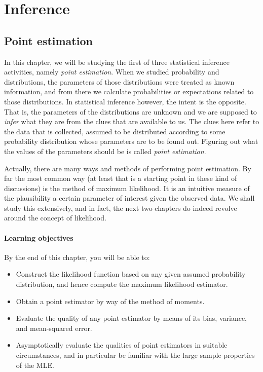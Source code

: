 \documentclass[
]{book}
\providecommand{\tightlist}{%
  \setlength{\itemsep}{0pt}\setlength{\parskip}{0pt}}
\theoremstyle{definition}
\theoremstyle{definition}
\theoremstyle{definition}
\theoremstyle{definition}
\theoremstyle{remark}
\begin{document}
\hypertarget{part-inference}{%
\part{Inference}\label{part-inference}}

\hypertarget{point-estimation}{%
\chapter{Point estimation}\label{point-estimation}}

In this chapter, we will be studying the first of three statistical inference activities, namely \emph{point estimation}.
When we studied probability and distributions, the parameters of those distributions were treated as known information, and from there we calculate probabilities or expectations related to those distributions.
In statistical inference however, the intent is the opposite.
That is, the parameters of the distributions are unknown and we are supposed to \emph{infer} what they are from the clues that are available to us.
The clues here refer to the data that is collected, assumed to be distributed according to some probability distribution whose parameters are to be found out.
Figuring out what the values of the parameters should be is called \emph{point estimation}.

Actually, there are many ways and methods of performing point estimation.
By far the most common way (at least that is a starting point in these kind of discussions) is the method of maximum likelihood.
It is an intuitive measure of the plausibility a certain parameter of interest given the observed data.
We shall study this extensively, and in fact, the next two chapters do indeed revolve around the concept of likelihood.

\hypertarget{learning-objectives-3}{%
\subsection*{Learning objectives}\label{learning-objectives-3}}

By the end of this chapter, you will be able to:

\begin{itemize}
\tightlist
\item
  Construct the likelihood function based on any given assumed probability distribution, and hence compute the maximum likelihood estimator.
\item
  Obtain a point estimator by way of the method of moments.
\item
  Evaluate the quality of any point estimator by means of its bias, variance, and mean-squared error.
\item
  Asymptotically evaluate the qualities of point estimators in suitable circumstances, and in particular be familiar with the large sample properties of the MLE.
\end{itemize}
\end{document}
